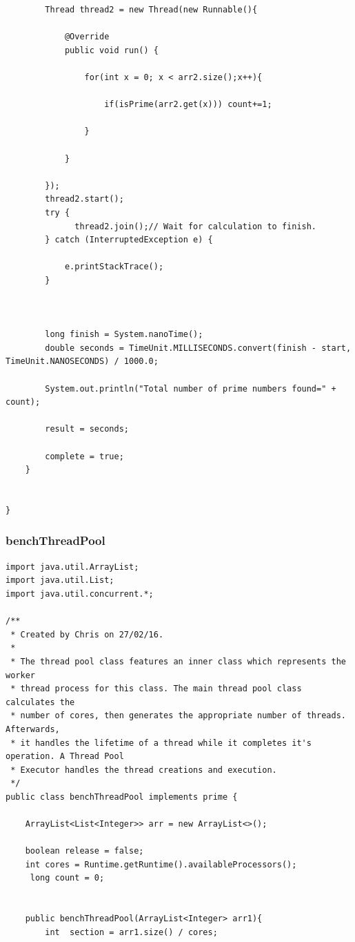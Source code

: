 \documentclass[10pt]{article}  %
\theoremstyle{definition}
\theoremstyle{remark}
\begin{document}
\begin{appendices}
\begin{lstlisting}
        Thread thread2 = new Thread(new Runnable(){

            @Override
            public void run() {

                for(int x = 0; x < arr2.size();x++){

                    if(isPrime(arr2.get(x))) count+=1;

                }

            }

        });
        thread2.start();
        try {
              thread2.join();// Wait for calculation to finish.
        } catch (InterruptedException e) {

            e.printStackTrace();
        }



        long finish = System.nanoTime();
        double seconds = TimeUnit.MILLISECONDS.convert(finish - start, TimeUnit.NANOSECONDS) / 1000.0;

        System.out.println("Total number of prime numbers found=" + count);

        result = seconds;

        complete = true;
    }


}
\end{lstlisting}
 
\newpage
\subsubsection{benchThreadPool}\label{tp} 
  \begin{lstlisting}
import java.util.ArrayList;
import java.util.List;
import java.util.concurrent.*;

/**
 * Created by Chris on 27/02/16.
 *
 * The thread pool class features an inner class which represents the worker
 * thread process for this class. The main thread pool class calculates the
 * number of cores, then generates the appropriate number of threads. Afterwards,
 * it handles the lifetime of a thread while it completes it's operation. A Thread Pool
 * Executor handles the thread creations and execution.
 */
public class benchThreadPool implements prime {

    ArrayList<List<Integer>> arr = new ArrayList<>();

    boolean release = false;
    int cores = Runtime.getRuntime().availableProcessors();
     long count = 0;


    public benchThreadPool(ArrayList<Integer> arr1){
        int  section = arr1.size() / cores;


\end{lstlisting}
\end{appendices}
\end{document}
